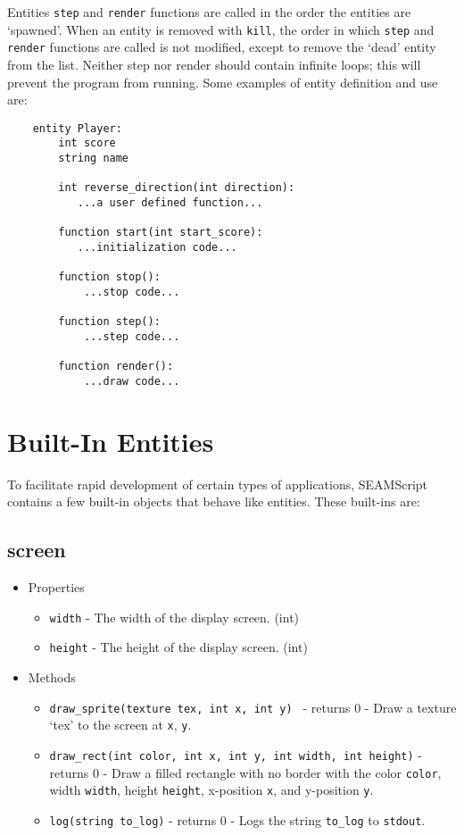 \documentclass[titlepage]{article}
\begin{document}
Entities \verb|step| and \verb|render| functions are called in the order the entities are ‘spawned’. When an entity is removed with \verb|kill|, the order in which \verb|step| and \verb|render| functions are called is not modified, except to remove the ‘dead’ entity from the list. Neither step nor render should contain infinite loops; this will prevent the program from running.
Some examples of entity definition and use are:
\begin{verbatim}
    entity Player:
        int score
        string name

        int reverse_direction(int direction):
           ...a user defined function...
		
        function start(int start_score):
           ...initialization code...
		
        function stop():
            ...stop code...
		
        function step():
            ...step code...

        function render():
            ...draw code...
\end{verbatim}
\section{Built-In Entities}
To facilitate rapid development of certain types of applications, SEAMScript contains a few built-in objects that behave like entities. These built-ins are:
\subsection{screen}
\begin{itemize}
\item  Properties
\begin{itemize}
\item \verb|width| - The width of the display screen. (int) 
\item \verb|height| - The height of the display screen. (int)
\end{itemize}

\item Methods
\begin{itemize}
\item \verb|draw_sprite(texture tex, int x, int y) | - returns 0 - Draw a texture ‘tex’ to the screen at \verb|x|, \verb|y|.
\item \verb|draw_rect(int color, int x, int y, int width, int height)| - returns 0 - Draw a filled rectangle with no border with the color \verb|color|, width \verb|width|, height \verb|height|, x-position \verb|x|, and y-position \verb|y|.
\item \verb|log(string to_log)| - returns 0 - Logs the string \verb|to_log| to \verb|stdout|.
\end{itemize}

\end{itemize}
\end{document}
